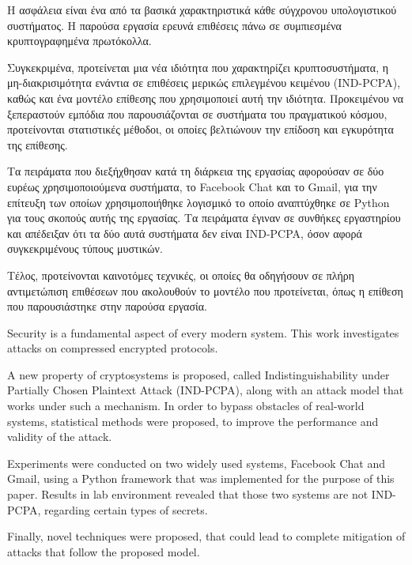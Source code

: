 \begin{abstractgr}

Η ασφάλεια είναι ένα από τα βασικά χαρακτηριστικά κάθε σύγχρονου υπολογιστικού
συστήματος. Η παρούσα εργασία ερευνά επιθέσεις πάνω σε συμπιεσμένα
κρυπτογραφημένα πρωτόκολλα.

Συγκεκριμένα, προτείνεται μια νέα ιδιότητα που χαρακτηρίζει κρυπτοσυστήματα, η
μη-διακρισιμότητα ενάντια σε επιθέσεις μερικώς επιλεγμένου κειμένου (IND-PCPA),
καθώς και ένα μοντέλο επίθεσης που χρησιμοποιεί αυτή την ιδιότητα. Προκειμένου
να ξεπεραστούν εμπόδια που παρουσιάζονται σε συστήματα του πραγματικού κόσμου,
προτείνονται στατιστικές μέθοδοι, οι οποίες βελτιώνουν την επίδοση και
εγκυρότητα της επίθεσης.

Τα πειράματα που διεξήχθησαν κατά τη διάρκεια της εργασίας αφορούσαν σε δύο
ευρέως χρησιμοποιούμενα συστήματα, το Facebook Chat και το Gmail, για την
επίτευξη των οποίων χρησιμοποιήθηκε λογισμικό το οποίο αναπτύχθηκε σε Python
για τους σκοπούς αυτής της εργασίας. Τα πειράματα έγιναν σε συνθήκες εργαστηρίου
και απέδειξαν ότι τα δύο αυτά συστήματα δεν είναι IND-PCPA, όσον αφορά
συγκεκριμένους τύπους μυστικών.

Τέλος, προτείνονται καινοτόμες τεχνικές, οι οποίες θα οδηγήσουν σε πλήρη
αντιμετώπιση επιθέσεων που ακολουθούν το μοντέλο που προτείνεται, όπως η
επίθεση που παρουσιάστηκε στην παρούσα εργασία.

\end{abstractgr}

\begin{abstracten}

Security is a fundamental aspect of every modern system. This work investigates
attacks on compressed encrypted protocols.

A new property of cryptosystems is proposed, called Indistinguishability under
Partially Chosen Plaintext Attack (IND-PCPA), along with an attack model that
works under such a mechanism. In order to bypass obstacles of real-world
systems, statistical methods were proposed, to improve the performance and
validity of the attack.

Experiments were conducted on two widely used systems, Facebook Chat and Gmail, using
a Python framework that was implemented for the purpose of this paper. Results
in lab environment revealed that those two systems are not IND-PCPA, regarding
certain types of secrets.

Finally, novel techniques were proposed, that could lead to complete mitigation
of attacks that follow the proposed model.

\end{abstracten}

